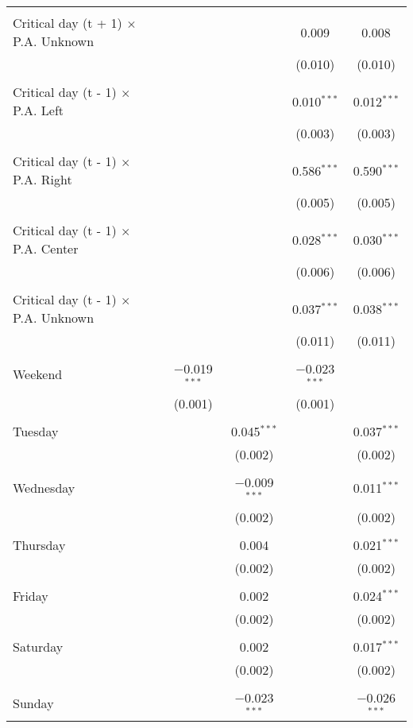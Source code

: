\documentclass[
]{article}
\begin{document}
\begin{table}[!htbp]
{\begin{tabular}{@{\extracolsep{5pt}}lcccc}
  & & & & \\ 
 Critical day (t + 1) $\times$ P.A. Unknown &  &  & 0.009 & 0.008 \\ 
  &  &  & (0.010) & (0.010) \\ 
  & & & & \\ 
 Critical day (t - 1) $\times$ P.A. Left &  &  & 0.010$^{***}$ & 0.012$^{***}$ \\ 
  &  &  & (0.003) & (0.003) \\ 
  & & & & \\ 
 Critical day (t - 1) $\times$ P.A. Right &  &  & 0.586$^{***}$ & 0.590$^{***}$ \\ 
  &  &  & (0.005) & (0.005) \\ 
  & & & & \\ 
 Critical day (t - 1) $\times$ P.A. Center &  &  & 0.028$^{***}$ & 0.030$^{***}$ \\ 
  &  &  & (0.006) & (0.006) \\ 
  & & & & \\ 
 Critical day (t - 1) $\times$ P.A. Unknown &  &  & 0.037$^{***}$ & 0.038$^{***}$ \\ 
  &  &  & (0.011) & (0.011) \\ 
  & & & & \\ 
 Weekend & $-$0.019$^{***}$ &  & $-$0.023$^{***}$ &  \\ 
  & (0.001) &  & (0.001) &  \\ 
  & & & & \\ 
 Tuesday &  & 0.045$^{***}$ &  & 0.037$^{***}$ \\ 
  &  & (0.002) &  & (0.002) \\ 
  & & & & \\ 
 Wednesday &  & $-$0.009$^{***}$ &  & 0.011$^{***}$ \\ 
  &  & (0.002) &  & (0.002) \\ 
  & & & & \\ 
 Thursday &  & 0.004 &  & 0.021$^{***}$ \\ 
  &  & (0.002) &  & (0.002) \\ 
  & & & & \\ 
 Friday &  & 0.002 &  & 0.024$^{***}$ \\ 
  &  & (0.002) &  & (0.002) \\ 
  & & & & \\ 
 Saturday &  & 0.002 &  & 0.017$^{***}$ \\ 
  &  & (0.002) &  & (0.002) \\ 
  & & & & \\ 
 Sunday &  & $-$0.023$^{***}$ &  & $-$0.026$^{***}$ \\ 

\end{tabular}}
\end{table}
\end{document}
